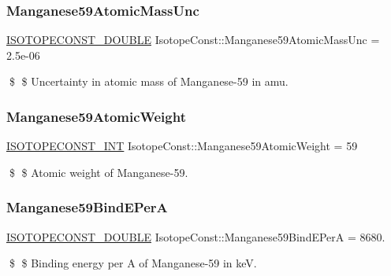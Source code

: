 \subsubsection{\texorpdfstring{Manganese59\+Atomic\+Mass\+Unc}{Manganese59AtomicMassUnc}}
{\footnotesize\ttfamily \mbox{\hyperlink{group___isotope_const-_macros_ga8f45a7272ce02c0b4c65c44636ed719a}{I\+S\+O\+T\+O\+P\+E\+C\+O\+N\+S\+T\+\_\+\+D\+O\+U\+B\+LE}} Isotope\+Const\+::\+Manganese59\+Atomic\+Mass\+Unc = 2.\+5e-\/06}

\$ \$ Uncertainty in atomic mass of Manganese-\/59 in amu. \mbox{\label{group___isotope_const-_manganese-_mn59_ga994c1f8f3f0667b64f2c9efac76330be}} 
\subsubsection{\texorpdfstring{Manganese59\+Atomic\+Weight}{Manganese59AtomicWeight}}
{\footnotesize\ttfamily \mbox{\hyperlink{group___isotope_const-_macros_ga5f18360b3e99483a35c32d789e62621c}{I\+S\+O\+T\+O\+P\+E\+C\+O\+N\+S\+T\+\_\+\+I\+NT}} Isotope\+Const\+::\+Manganese59\+Atomic\+Weight = 59}

\$ \$ Atomic weight of Manganese-\/59. \mbox{\label{group___isotope_const-_manganese-_mn59_ga09a0972fb09913b1cbbe570664323b90}} 
\subsubsection{\texorpdfstring{Manganese59\+Bind\+E\+PerA}{Manganese59BindEPerA}}
{\footnotesize\ttfamily \mbox{\hyperlink{group___isotope_const-_macros_ga8f45a7272ce02c0b4c65c44636ed719a}{I\+S\+O\+T\+O\+P\+E\+C\+O\+N\+S\+T\+\_\+\+D\+O\+U\+B\+LE}} Isotope\+Const\+::\+Manganese59\+Bind\+E\+PerA = 8680.}

\$ \$ Binding energy per A of Manganese-\/59 in keV. \mbox{\label{group___isotope_const-_manganese-_mn59_gad9f6e64d7abe0fdd0b02a13fef729bcf}} 
